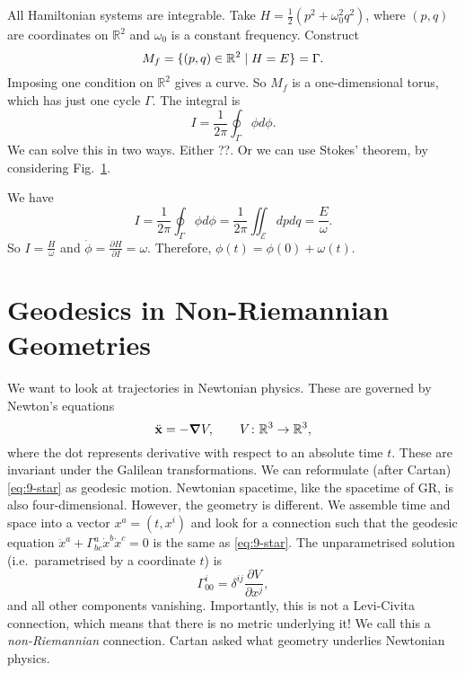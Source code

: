 \begin{example}[$M = \mathbb{R}^2$]
  All Hamiltonian systems are integrable.
  Take $H = \frac{1}{2}(p^2+ \omega_0^2 q^2)$, where $(p, q)$ are coordinates on $\mathbb{R}^2$ and $\omega_0$ is a constant frequency.
  Construct
  \begin{equation}
    M_f = \{(p, q) \in \mathbb{R}^2 \suchthat H = E\} = \Gamma.
  \end{equation}
  Imposing one condition on $\mathbb{R}^2$ gives a curve. So $M_f$ is a one-dimensional torus, which has just one cycle $\Gamma$.
  The integral is
  \begin{equation}
    I = \frac{1}{2\pi} \oint_\Gamma \phi d\phi.
  \end{equation}
  We can solve this in two ways. Either ??.
  Or we can use Stokes' theorem, by considering Fig.~\ref{fig:l9f3}.
  \begin{figure}[tbhp]
    \centering
    \def\svgwidth{0.4\columnwidth}
    
    \caption{}
    \label{fig:l9f3}
  \end{figure}
  We have
  \begin{equation}
    I = \frac{1}{2\pi} \oint_\Gamma \phi d\phi = \frac{1}{2\pi} \iint_{\mathcal{E}} dp dq = \frac{E}{\omega}.
  \end{equation}
  So $I = \frac{H}{\omega}$ and $\dot{\phi} = \frac{\partial H}{\partial I} = \omega$. Therefore, $\phi(t) = \phi(0) + \omega (t)$.
\end{example}

\section{Geodesics in Non-Riemannian Geometries}%
\label{sec:geodesics_in_non_riemannian_geometries}

We want to look at trajectories in Newtonian physics.
These are governed by Newton's equations
\begin{equation}
  \label{eq:9-star}
  \ddot{\vb{x}} = - \grad V, \qquad V \colon \mathbb{R}^3 \to \mathbb{R}^3,
\end{equation}
where the dot represents derivative with respect to an absolute time $t$.
These are invariant under the Galilean transformations.
We can reformulate (after Cartan) \eqref{eq:9-star} as geodesic motion.
Newtonian spacetime, like the spacetime of GR, is also four-dimensional. However, the geometry is different.
We assemble time and space into a vector $x^a = (t, x^{i})$ and look for a connection such that the geodesic equation $ \ddot x^{a}  + \Gamma^{a}_{bc} \dot x^{b} \dot x^{c} = 0 $ is the same as \eqref{eq:9-star}.
The unparametrised solution (i.e.~parametrised by a coordinate $t$) is
\begin{equation}
  \Gamma^{i}_{00} = \delta^{ij} \frac{\partial V}{\partial x^{j}},
\end{equation}
and all other components vanishing.
Importantly, this is not a Levi-Civita connection, which means that there is no metric underlying it!
We call this a \emph{non-Riemannian} connection.
Cartan asked what geometry underlies Newtonian physics.


